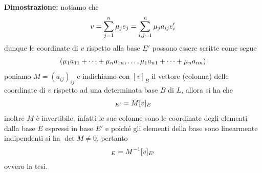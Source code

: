 \documentclass{article}
\begin{document}
\textbf{Dimostrazione:} notiamo che
\begin{gather}
    v = \sum_{j = 1}^n\mu_je_j = \sum_{i, j = 1}^n\mu_ja_{ij}e'_i \notag
\end{gather}
dunque le coordinate di $v$ rispetto alla base $E'$ possono essere scritte come segue
\begin{gather}
    (\mu_1a_{11} + \dots + \mu_na_{1n}, \dots, \mu_1a_{n1} + \dots + \mu_na_{nn}) \notag
\end{gather}
poniamo $M = (a_{ij})_{ij}$ e indichiamo con $[v]_{B}$ il vettore (colonna) delle coordinate di $v$ rispetto ad una determinata base $B$ di $L$, allora si ha che
\begin{gather}
    [v]_{E'} = M[v]_E \notag
\end{gather}
inoltre $M$ è invertibile, infatti le sue colonne sono le coordinate degli elementi dalla base $E$ espressi in base $E'$ e poiché gli elementi della base sono linearmente indipendenti si ha $\det M \neq 0$, pertanto
\begin{gather}
    [v]_E = M^{-1}[v]_{E'} \notag
\end{gather}
ovvero la tesi.

\newpage
\end{document}
